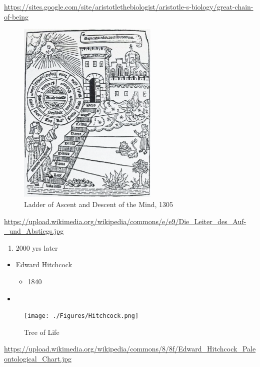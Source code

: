 \documentclass[
]{book}
\providecommand{\tightlist}{%
  \setlength{\itemsep}{0pt}\setlength{\parskip}{0pt}}
\begin{document}
\url{https://sites.google.com/site/aristotlethebiologist/aristotle-s-biology/great-chain-of-being}

\begin{figure}
\centering
\includegraphics[width=0.6\textwidth,height=\textheight]{./Figures/Scala3.png}
\caption{Ladder of Ascent and Descent of the Mind, 1305}
\end{figure}

\url{https://upload.wikimedia.org/wikipedia/commons/e/e9/Die_Leiter_des_Auf-_und_Abstiegs.jpg}

\begin{enumerate}
\def\labelenumi{\arabic{enumi}.}
\setcounter{enumi}{1}
\tightlist
\item
  2000 yrs later
\end{enumerate}

\begin{itemize}
\tightlist
\item
  Edward Hitchcock

  \begin{itemize}
  \tightlist
  \item
    1840
  \end{itemize}
\item
\end{itemize}

\begin{figure}
\centering
\texttt{[image: ./Figures/Hitchcock.png]}
\caption{Tree of Life}
\end{figure}

\url{https://upload.wikimedia.org/wikipedia/commons/8/8f/Edward_Hitchcock_Paleontological_Chart.jpg}
\end{document}
